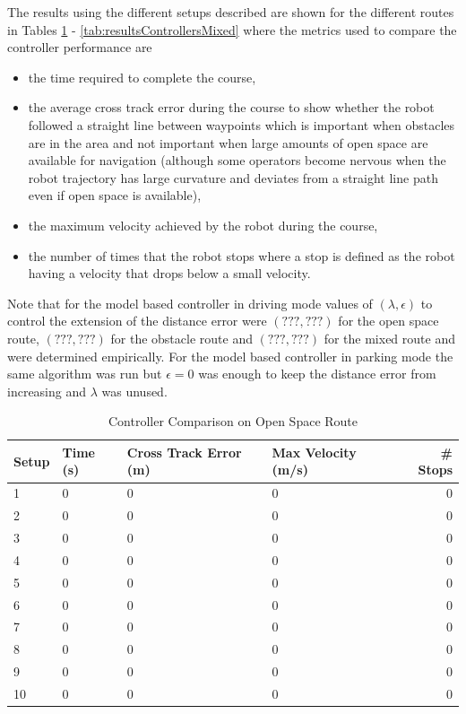 The results using the different setups described are shown for the different routes in Tables \ref{tab:resultsControllersOpenSpace} - \ref{tab:resultsControllersMixed} where the metrics used to compare the controller performance are
\begin{itemize}
\item the time required to complete the course,
\item the average cross track error during the course to show whether the robot followed a straight line between waypoints which is important when obstacles are in the area and not important when large amounts of open space are available for navigation (although some operators become nervous when the robot trajectory has large curvature and deviates from a straight line path even if open space is available),
\item the maximum velocity achieved by the robot during the course,
\item the number of times that the robot stops where a stop is defined as the robot having a velocity that drops below a small velocity.
\end{itemize}
Note that for the model based controller in driving mode values of $(\lambda, \epsilon)$ to control the extension of the distance error were $(???,???)$ for the open space route, $(???,???)$ for the obstacle route and $(???,???)$ for the mixed route and were determined empirically. For the model based controller in parking mode the same algorithm was run but $\epsilon=0$ was enough to keep the distance error from increasing and $\lambda$ was unused.

\begin{table}[ht!]
\caption{Controller Comparison on Open Space Route}
\small
\centering
\begin{tabular}{@{}llllr@{}} \toprule
Setup & Time (s) & Cross Track Error (m) & Max Velocity (m/s) & \# Stops \\ \midrule
1     & 0        & 0                     & 0                  & 0        \\
2     & 0        & 0                     & 0                  & 0        \\
3     & 0        & 0                     & 0                  & 0        \\
4     & 0        & 0                     & 0                  & 0        \\
5     & 0        & 0                     & 0                  & 0        \\
6     & 0        & 0                     & 0                  & 0        \\
7     & 0        & 0                     & 0                  & 0        \\
8     & 0        & 0                     & 0                  & 0        \\
9     & 0        & 0                     & 0                  & 0        \\
10    & 0        & 0                     & 0                  & 0        \\ \bottomrule
\end{tabular}
\label{tab:resultsControllersOpenSpace}
\end{table}

